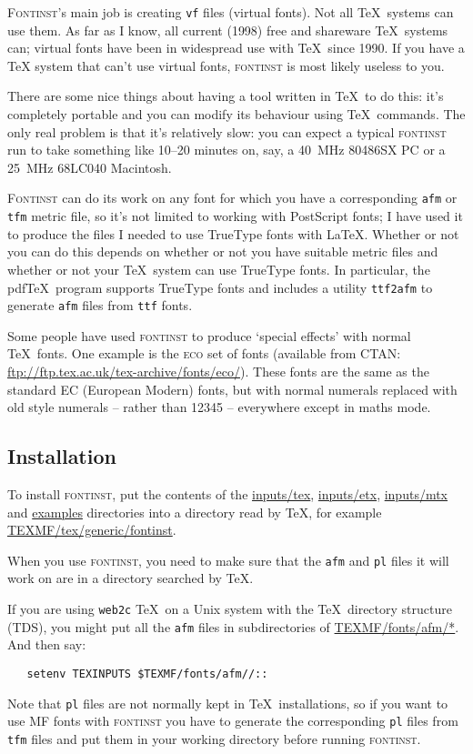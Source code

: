 \documentclass[a4paper]{ltxguide}
\newcommand{\PS}{Post\-Script\xspace}
\newcommand{\TT}{True\-Type\xspace}
\newcommand*{\setfilename}[1]{\texttt{#1}}
\newcommand*{\setpackagename}[1]{\textsc{#1}}
\newcommand{\fontinst}{\setpackagename{font\-inst}\xspace}
\newcommand{\Fontinst}{\setpackagename{Font\-inst}\xspace}
\newcommand{\vf} {\setfilename{vf}\xspace}
\newcommand{\pl} {\setfilename{pl}\xspace}
\newcommand{\afm}{\setfilename{afm}\xspace}
\newcommand{\tfm}{\setfilename{tfm}\xspace}
\newcommand{\ttf}{\setfilename{ttf}\xspace}
\begin{document}
\Fontinst's main job is creating \vf files (virtual fonts).  Not
all \TeX\ systems can use them.  As far as I know, all current
(1998) free and shareware \TeX\ systems can; virtual fonts have
been in widespread use with \TeX\ since 1990.  If you have a TeX
system that can't use virtual fonts, \fontinst is most likely
useless to you.

There are some nice things about having a tool written in \TeX\ to
do this: it's completely portable and you can modify its behaviour
using \TeX\ commands.  The only real problem is that it's
relatively slow: you can expect a typical \fontinst run to take
something like 10--20 minutes on, say, a 40~MHz 80486SX PC or a
25~MHz 68LC040 Macintosh.

\Fontinst can do its work on any font for which you have a
corresponding \afm or \tfm metric file, so it's not limited to
working with \PS fonts; I have used it to produce the files I
needed to use \TT fonts with \LaTeX. Whether or not you can do
this depends on whether or not you have suitable metric files and
whether or not your \TeX\ system can use \TT fonts.  In
particular, the pdf\TeX\ program supports \TT fonts and includes a
utility \texttt{ttf2afm} to generate \afm files from \ttf fonts.

Some people have used \fontinst to produce `special effects' with
normal \TeX\ fonts.  One example is the \setpackagename{eco} set
of fonts (available from CTAN:
\url{ftp://ftp.tex.ac.uk/tex-archive/fonts/eco/}).  These fonts
are the same as the standard EC (European Modern) fonts, but with
normal numerals replaced with old style numerals --
 rather than 12345 -- everywhere except in
maths mode.

\subsection{Installation}

To install \fontinst, put the contents of the \url{inputs/tex},
\url{inputs/etx}, \url{inputs/mtx} and \url{examples} directories
into a directory read by \TeX, for example
\url{TEXMF/tex/generic/fontinst}.

When you use \fontinst, you need to make sure that the \afm and
\pl files it will work on are in a directory searched by \TeX.

If you are using \texttt{web2c} \TeX\ on a Unix system with the
\TeX\ directory structure (TDS), you might put all the \afm files
in subdirectories of \url{TEXMF/fonts/afm/*}.  And then say:
\begin{verbatim}
   setenv TEXINPUTS $TEXMF/fonts/afm//::
\end{verbatim}%
Note that \pl files are not normally kept in \TeX\ installations, so
if you want to use MF fonts with \fontinst you have to generate the
corresponding \pl files from \tfm files and put them in your working
directory before running \fontinst.
\end{document}
